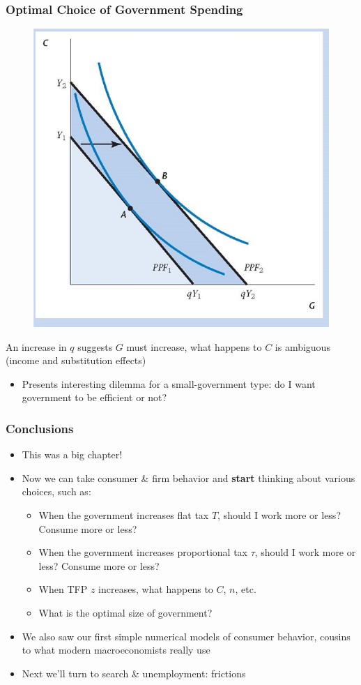 \documentclass{beamer}
\begin{document}
\begin{frame}
\frametitle[alignment=center]{Optimal Choice of Government Spending}
\begin{figure}
\centering
\includegraphics[scale=0.5]{Figures/W_Fig_5pt20.png}
\end{figure}
An increase in $q$ suggests $G$ must increase, what happens to $C$ is ambiguous (income and substitution effects)
\begin{itemize}
\item Presents interesting dilemma for a small-government type:  do I want government to be efficient or not?  
\end{itemize}
\end{frame}

\begin{frame}
\frametitle[alignment=center]{Conclusions}
\begin{itemize}
\item This was a big chapter!
\bigskip
\item Now we can take consumer \& firm behavior and \textbf{start} thinking about various choices, such as:
\begin{itemize}
\item When the government increases flat tax $T$, should I work more or less?  Consume more or less?
\bigskip
\item When the government increases proportional tax $\tau$, should I work more or less?  Consume more or less?
\bigskip
\item When  TFP  $z$ increases, what happens to $C$, $n$, etc.
\bigskip
\item What is the optimal size of government?  
\end{itemize}
\item We also saw our first simple numerical models of consumer behavior, cousins to what modern macroeconomists really use
\bigskip
\item Next we'll turn to search \& unemployment:  frictions
\end{itemize}
\end{frame}
\end{document}
